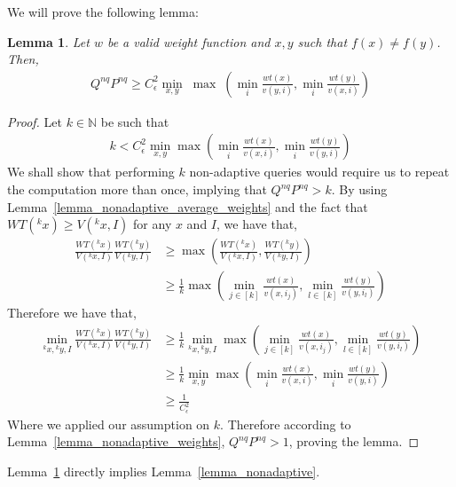 \documentclass[10pt,a4paper]{article}
\newcommand{\queryamount}[0]{\ensuremath{Q}\xspace}
\newcommand{\abilityamount}[0]{\ensuremath{P}\xspace} %
\newcommand{\nonadaptivelabel}[0]{\ensuremath{nq}\xspace}
\newtheorem{lemma}[theorem]{Lemma}
\begin{document}
We will prove the following lemma:
\begin{lemma}\label{lemma_nonadaptive_final}
    Let $w$ be a valid weight function and $x,y$ such that $f(x)\neq f(y)$. Then,
    \begin{align*}
    \queryamount^{\nonadaptivelabel} \abilityamount^{\nonadaptivelabel} \geq C^2_{\epsilon} \min_{x,y}\; \max\; \left(\min_i \frac{wt(x)}{v(y,i)}, \min_i \frac{wt(y)}{v(x,i)}\right)
    \end{align*}
\end{lemma}
\begin{proof}
    Let $k\in \mathbb{N}$ be such that
    \begin{align}
        k < C^2_{\epsilon} \min_{x,y} \max \left(\min_i \frac{wt(x)}{v(x,i)}, \min_i \frac{wt(y)}{v(y,i)}\right)
    \end{align}
    We shall show that performing $k$ non-adaptive queries would require us to repeat the computation more than once, implying that $\queryamount^{\nonadaptivelabel}\abilityamount^{\nonadaptivelabel}>k$. By using Lemma~\ref{lemma_nonadaptive_average_weights} and the fact that $WT({}^kx)\geq V({}^kx,I)$ for any $x$ and $I$, we have that,
    \begin{align*}
        \frac{WT({}^kx)}{V({}^kx, I)}\frac{WT({}^ky)}{V({}^ky, I)} &\geq \max \left(\frac{WT({}^kx)}{V({}^kx, I)},\frac{WT({}^ky)}{V({}^ky, I)}\right)\\
        &\geq \frac{1}{k} \max \left(\min_{j\in [k]}\frac{wt(x)}{v(x,i_j)}, \min_{l\in [k]}\frac{wt(y)}{v(y,i_l)}\right)
    \end{align*}
    Therefore we have that,
    \begin{align*}
        \min_{{}^kx, {}^ky, I} \frac{WT({}^kx)}{V({}^kx, I)}\frac{WT({}^ky)}{V({}^ky, I)} &\geq \frac{1}{k} \min_{{}^kx, {}^ky, I} \max \left(\min_{j\in [k]}\frac{wt(x)}{v(x,i_j)}, \min_{l\in [k]}\frac{wt(y)}{v(y,i_l)}\right)\\
        &\geq \frac{1}{k} \min_{x, y} \max \left(\min_i \frac{wt(x)}{v(x,i)}, \min_i \frac{wt(y)}{v(y,i)}\right)\\
        & \geq \frac{1}{C^2_{\epsilon}}
    \end{align*}
    Where we applied our assumption on $k$. Therefore according to Lemma~\ref{lemma_nonadaptive_weights}, $\queryamount^{\nonadaptivelabel}\abilityamount^{\nonadaptivelabel} > 1$, proving the lemma.
\end{proof}

Lemma~\ref{lemma_nonadaptive_final} directly implies Lemma~\ref{lemma_nonadaptive}.
\end{document}
